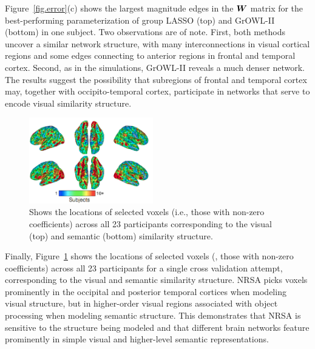 Figure~\ref{fig.error}(c) shows the largest magnitude edges in the $\boldsymbol{W}$ matrix
for the best-performing parameterization of group LASSO (top) and GrOWL-II
(bottom) in one subject. Two observations are of note. First, both methods
uncover a similar network structure, with many interconnections in visual
cortical regions and some edges connecting to anterior regions in frontal and
temporal cortex. Second, as in the simulations, GrOWL-II reveals a much denser
network. The results suggest the possibility that subregions of frontal and
temporal cortex may, together with occipito-temporal cortex, participate in
networks that serve to encode visual similarity structure.

\ifdefined\SEMANTIC
\begin{figure}[!h]
  \centering
    \includegraphics[width=0.48\textwidth]{figures/vissem.png}%
    \caption{Shows the locations of selected voxels (i.e., those with non-zero
      coefficients) across all 23 participants corresponding to the visual (top)
      and semantic (bottom) similarity structure. }
    \label{fig.vissem}
\end{figure}

Finally, Figure~\ref{fig.vissem} shows the locations of selected voxels (\ie,
those with non-zero coefficients) across all 23 participants for a single cross
validation attempt, corresponding to the visual and semantic similarity
structure. NRSA picks voxels prominently in the occipital and posterior temporal
cortices when modeling visual structure, but in higher-order visual regions
associated with object processing when modeling semantic structure. This
demonstrates that NRSA is sensitive to the structure being modeled and that
different brain networks feature prominently in simple visual and higher-level
semantic representations.
\fi%
